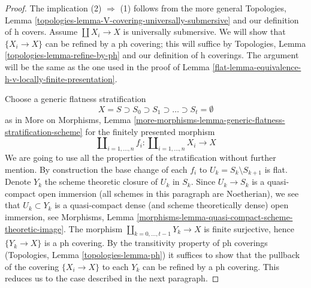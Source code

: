 \begin{proof}

The implication (2) $\Rightarrow$ (1) follows from the more general
Topologies, Lemma \ref{topologies-lemma-V-covering-universally-submersive}
and our definition of h covers. Assume $\coprod X_i \to X$
is universally submersive. We will show that $\{X_i \to X\}$
can be refined by a ph covering; this will suffice by
Topologies, Lemma \ref{topologies-lemma-refine-by-ph} and
our definition of h coverings.
The argument will be the same as the one used in the proof of
Lemma \ref{flat-lemma-equivalence-h-v-locally-finite-presentation}.

\medskip\noindent
Choose a generic flatness stratification
$$
X = S \supset S_0 \supset S_1 \supset \ldots \supset S_t = \emptyset
$$
as in More on Morphisms, Lemma
\ref{more-morphisms-lemma-generic-flatness-stratification-scheme}
for the finitely presented morphism
$$
\coprod\nolimits_{i = 1, \ldots, n} f_i :
\coprod\nolimits_{i = 1, \ldots, n} X_i
\longrightarrow
X
$$
We are going to use all the properties of the stratification
without further mention. By construction the base change of each
$f_i$ to $U_k = S_k \setminus S_{k + 1}$ is flat.
Denote $Y_k$ the scheme theoretic closure of $U_k$ in $S_k$. Since
$U_k \to S_k$ is a quasi-compact open immersion (all schemes in
this paragraph are Noetherian),
we see that $U_k \subset Y_k$ is a quasi-compact dense
(and scheme theoretically dense) open immersion, see
Morphisms, Lemma \ref{morphisms-lemma-quasi-compact-scheme-theoretic-image}.
The morphism $\coprod_{k = 0, \ldots, t - 1} Y_k \to X$
is finite surjective, hence $\{Y_k \to X\}$ is a ph covering.
By the transitivity property of ph coverings
(Topologies, Lemma \ref{topologies-lemma-ph})
it suffices to show that the pullback of
the covering $\{X_i \to X\}$ to each $Y_k$ can be refined by a
ph covering. This reduces us to the case described in the
next paragraph.


\end{proof}
